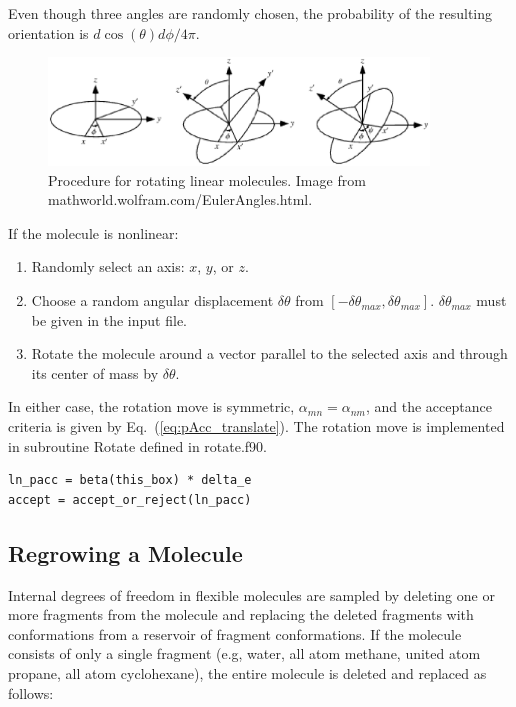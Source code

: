 Even though three angles are randomly chosen, the probability of the resulting orientation is $d\cos(\theta)d\phi/4\pi$.

\begin{figure}[h]
	\centering
	\includegraphics[width=0.9\textwidth]{EulerAngles}
	\caption{Procedure for rotating linear molecules. \newline Image from mathworld.wolfram.com/EulerAngles.html.}
	\label{fig:EulerAngles}
\end{figure}

If the molecule is nonlinear:

\begin{enumerate}
	\item Randomly select an axis: $x$, $y$, or $z$.
	\item Choose a random angular displacement $\delta \theta$ from $[-\delta \theta_{max}, \delta \theta_{max}]$. $\delta \theta_{max}$ must be given in the input file.
	\item Rotate the molecule around a vector parallel to the selected axis and through its center of mass by $\delta \theta$.
\end{enumerate}

In either case, the rotation move is symmetric, $\alpha_{mn} = \alpha_{nm}$, and the acceptance criteria is given by Eq.\ (\ref{eq:pAcc_translate}). The rotation move is implemented in subroutine Rotate defined in rotate.f90.

\begin{lstlisting}[firstnumber=261, caption=rotate.f90, label=code:rotate]
ln_pacc = beta(this_box) * delta_e
accept = accept_or_reject(ln_pacc)
\end{lstlisting}

\subsection{Regrowing a Molecule}
\label{sec:regrow}
Internal degrees of freedom in flexible molecules are sampled by deleting one or more fragments from the molecule and replacing the deleted fragments with conformations from a reservoir of fragment conformations. If the molecule consists of only a single fragment (e.g, water, all atom methane, united atom propane, all atom cyclohexane), the entire molecule is deleted and replaced as follows:

